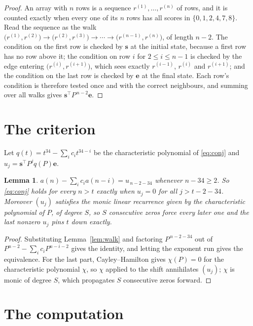 \documentclass[11pt,a4paper]{article}
\theoremstyle{plain}
\newtheorem{lemma}[theorem]{Lemma}
\theoremstyle{definition}
\begin{document}
\begin{proof}
An array with $n$ rows is a sequence $r^{(1)},\dots,r^{(n)}$ of rows, and it is counted
exactly when every one of its $n$ rows has all scores in $\{0,1,2,4,7,8\}$. Read the sequence as the
walk $\bigl(r^{(1)},r^{(2)}\bigr)\to\bigl(r^{(2)},r^{(3)}\bigr)\to\cdots\to
\bigl(r^{(n-1)},r^{(n)}\bigr)$, of length $n-2$. The condition on the first row is
checked by $\mathbf{s}$ at the initial state, because a first row has no row above it; the
condition on row $i$ for $2\le i\le n-1$ is checked by the edge entering
$\bigl(r^{(i)},r^{(i+1)}\bigr)$, which sees exactly $r^{(i-1)}$, $r^{(i)}$ and
$r^{(i+1)}$; and the condition on the last row is checked by $\mathbf{e}$ at the final
state. Each row's condition is therefore tested once and with the correct neighbours, and
summing over all walks gives $\mathbf{s}^{\!\top}P^{\,n-2}\mathbf{e}$.
\end{proof}

\section{The criterion}

Let $q(t)=t^{34}-\sum_i c_i t^{34-i}$ be the characteristic polynomial of
\eqref{eq:conj} and $u_j=\mathbf{s}^{\!\top}P^{j}q(P)\mathbf{e}$.

\begin{lemma}\label{lem:crit}
$a(n)-\sum_i c_i a(n-i)=u_{\,n-2-34}$ whenever $n-34\ge2$. So \eqref{eq:conj}
holds for every $n>t$ exactly when $u_j=0$ for all $j>t-2-34$. Moreover $(u_j)$
satisfies the monic linear recurrence given by the characteristic polynomial of $P$, of
degree $S$, so $S$ consecutive zeros force every later one and the last nonzero $u_j$ pins
$t$ down exactly.
\end{lemma}

\begin{proof}
Substituting Lemma~\ref{lem:walk} and factoring $P^{\,n-2-34}$ out of
$P^{n-2}-\sum_i c_i P^{n-i-2}$ gives the identity, and letting the exponent run gives the
equivalence. For the last part, Cayley--Hamilton gives $\chi(P)=0$ for the characteristic
polynomial $\chi$, so $\chi$ applied to the shift annihilates $(u_j)$; $\chi$ is monic of
degree $S$, which propagates $S$ consecutive zeros forward.
\end{proof}

\section{The computation}
\end{document}
